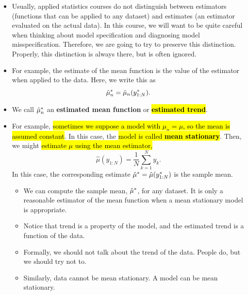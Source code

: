 \documentclass[]{article}
\begin{document}
\begin{itemize}
\item
  Usually, applied statistics courses do not distinguish between
  estimators (functions that can be applied to any dataset) and
  estimates (an estimator evaluated on the actual data). In this course,
  we will want to be quite careful when thinking about model
  specification and diagnosing model misspecification. Therefore, we are
  going to try to preserve this distinction. Properly, this distinction
  is always there, but is often ignored.
\item
  For example, the estimate of the mean function is the value of the
  estimator when applied to the data. Here, we write this as
  \[ \hat\mu_n^* = \hat\mu_n(y_{1:N}^*).\]
\item
  We call \(\hat\mu_n^*\) an \textbf{estimated mean function} or
  \hl{\textbf{estimated trend}}.
\item
  For example, \hl{sometimes we suppose a model with $\mu_n=\mu$, so the
  mean is assumed constant}. In this case, the \hl{model is called
  \textbf{mean stationary}}. Then, we might \hl{estimate $\mu$ using the
  mean estimator,} \[\hat\mu(y_{1:N})=\frac{1}{N}\sum_{k=1}^N y_k.\] In
  this case, the corresponding estimate
  \(\hat\mu^*=\hat\mu(y_{1:N}^*)\) is the sample mean.

  \begin{itemize}
  \item
    We can compute the sample mean, \(\hat\mu^*\), for any dataset.
    It is only a reasonable estimator of the mean function when a mean
    stationary model is appropriate.
  \item
    Notice that trend is a property of the model, and the estimated
    trend is a function of the data.
  \item
    Formally, we should not talk about the trend of the data. People do,
    but we should try not to.
  \item
    Similarly, data cannot be mean stationary. A model can be mean
    stationary.
  \end{itemize}
\end{itemize}
\end{document}
